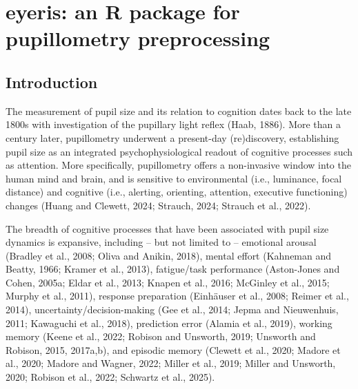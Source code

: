 \chapter{eyeris: an R package for pupillometry preprocessing}

\section{Introduction}
The measurement of pupil size and its relation to cognition dates back to the late 1800s with investigation of the pupillary light reflex (Haab, 1886). More than a century later, pupillometry underwent a present-day (re)discovery, establishing pupil size as an integrated psychophysiological readout of cognitive processes such as attention. More specifically, pupillometry offers a non-invasive window into the human mind and brain, and is sensitive to environmental (i.e., luminance, focal distance) and cognitive (i.e., alerting, orienting, attention, executive functioning) changes (Huang and Clewett, 2024; Strauch, 2024; Strauch et al., 2022).

The breadth of cognitive processes that have been associated with pupil size dynamics is expansive, including – but not limited to – emotional arousal (Bradley et al., 2008; Oliva and Anikin, 2018), mental effort (Kahneman and Beatty, 1966; Kramer et al., 2013), fatigue/task performance (Aston-Jones and Cohen, 2005a; Eldar et al., 2013; Knapen et al., 2016; McGinley et al., 2015; Murphy et al., 2011), response preparation (Einhäuser et al., 2008; Reimer et al., 2014), uncertainty/decision-making (Gee et al., 2014; Jepma and Nieuwenhuis, 2011; Kawaguchi et al., 2018), prediction error (Alamia et al., 2019), working memory (Keene et al., 2022; Robison and Unsworth, 2019; Unsworth and Robison, 2015, 2017a,b), and episodic memory (Clewett et al., 2020; Madore et al., 2020; Madore and Wagner, 2022; Miller et al., 2019; Miller and Unsworth, 2020; Robison et al., 2022; Schwartz et al., 2025).

